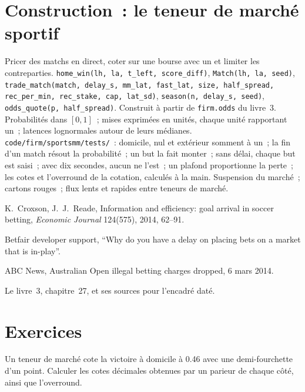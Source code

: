\section{Construction~: le teneur de marché sportif}\label{bld:hf:prediction-and-sports-market-making:sportsmm}

\begin{build}
 Pricer des matchs en direct, coter sur une bourse avec un  et limiter les contreparties.
 \texttt{home\_win(lh, la, t\_left, score\_diff)}, \texttt{Match(lh, la, seed)},
\texttt{trade\_match(match, delay\_s, mm\_lat, fast\_lat, size, half\_spread, rec\_per\_min, rec\_stake, cap, lat\_sd)}, \texttt{season(n, delay\_s, seed)}, \texttt{odds\_quote(p, half\_spread)}.
Construit à partir de \texttt{firm.odds} du livre~3.
 Probabilités dans $[0,1]$~; mises exprimées en unités, chaque unité rapportant un~; latences lognormales autour de leurs médianes.
 \texttt{code/firm/sportsmm/tests/}~: domicile, nul et extérieur somment à un~; la fin d'un match résout la probabilité~; un but
la fait monter~; sans délai, chaque but est saisi~; avec dix secondes, aucun ne l'est~; un plafond proportionne la perte~; les cotes et l'overround de la cotation, calculés à la main.
 Suspension du marché~; cartons rouges~; flux lents et rapides entre teneurs de marché.
\end{build}

\begin{omsources}
\item K.~Croxson, J.~J.~Reade, Information and efficiency: goal arrival in soccer betting, \emph{Economic Journal} 124(575), 2014, 62--91.
\item Betfair developer support, ``Why do you have a delay on placing bets on a market that is in-play''.
\item ABC News, Australian Open illegal betting charges dropped, 6 mars 2014.
\item Le livre~3, chapitre~27, et ses sources pour l'encadré daté.
\end{omsources}

\section{Exercices}

\begin{exercise}[$\star$]\label{exo:hf:prediction-and-sports-market-making:1}
Un teneur de marché cote la victoire à domicile à 0.46 avec une demi-fourchette d'un point. Calculer les cotes décimales obtenues par un parieur de chaque côté, ainsi que l'overround.
\end{exercise}

